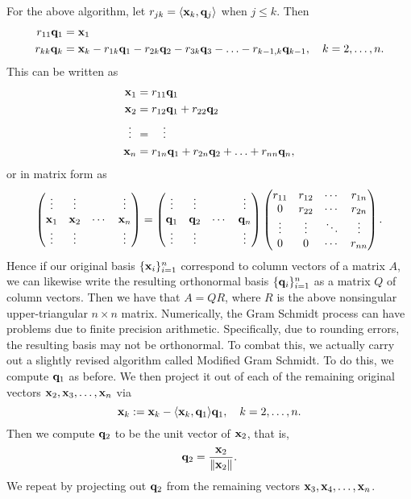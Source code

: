 For the above algorithm, let $r_{j k} = \langle {\bf x}_k, {\bf q}_j\rangle$ when $j \leq k$.
Then
\begin{align*}
r_{1 1} {\bf q}_1 &= {\bf x}_1\\
r_{k k} {\bf q}_k &= {\bf x}_k - r_{1 k} {\bf q}_1 - r_{2 k} {\bf q}_2 - r_{3 k} {\bf q}_3 -
\ldots - r_{k-1, k} {\bf q}_{k-1},\quad k=2,\ldots,n.
\end{align*}
This can be written as
\begin{align*}
{\bf x}_1 &= r_{1 1} {\bf q}_1\\
{\bf x}_2 &= r_{1 2} {\bf q}_1 + r_{2 2} {\bf q}_2\\
\vdots \:\: &= \quad \vdots\\
{\bf x}_n &= r_{1 n} {\bf q}_1 + r_{2 n} {\bf q}_2 + \ldots + r_{n n} {\bf q}_{n},
\end{align*}
or in matrix form as
\[
\begin{pmatrix}
\vdots & \vdots & & \vdots\\
{\bf x}_1 & {\bf x}_2 & \cdots & {\bf x}_n\\
\vdots & \vdots & & \vdots
\end{pmatrix}
=
\begin{pmatrix}
\vdots & \vdots & & \vdots\\
{\bf q}_1 & {\bf q}_2 & \cdots & {\bf q}_n\\
\vdots & \vdots & & \vdots
\end{pmatrix}
\begin{pmatrix}
r_{1 1} & r_{1 2} & \cdots & r_{1 n}\\
0 & r_{2 2} & \cdots & r_{2 n}\\
\vdots & \vdots & \ddots & \vdots\\
0 & 0 & \cdots & r_{n n}
\end{pmatrix}.
\]
Hence if our original basis $\{{\bf x}_i\}_{i=1}^n$ correspond to column
vectors of a matrix $A$, we can likewise write the resulting
orthonormal basis $\{{\bf q}_i\}_{i=1}^n$ as a matrix $Q$ of column
vectors.  Then we have that $A = Q R$, where $R$ is the above
nonsingular upper-triangular $n\times n$ matrix. 
Numerically, the Gram Schmidt process can have problems due to
finite precision arithmetic. Specifically, due to rounding errors,
the resulting basis may not be orthonormal. To combat this, we
actually carry out a slightly revised algorithm called Modified Gram
Schmidt.  To do this, we compute ${\bf q}_1$ as before.  We then project
it out of each of the remaining original vectors
${\bf x}_2,{\bf x}_3,\ldots,{\bf x}_n$ via
\[
{\bf x}_k := {\bf x}_k - \langle {\bf x}_{k}, {\bf q}_1\rangle {\bf q}_1,\quad k=2,\ldots,n.
\]
Then we compute ${\bf q}_2$ to be the unit vector of ${\bf x}_2$, that is,
\[
{\bf q}_2 = \frac{{\bf x}_2}{\|{\bf x}_2\|}.
\]
We repeat by projecting out ${\bf q}_2$ from the remaining vectors
${\bf x}_3,{\bf x}_4,\ldots,{\bf x}_n$.

